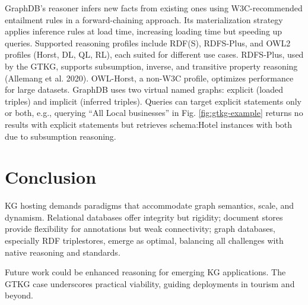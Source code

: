 \documentclass[12pt]{article}
\begin{document}
GraphDB’s reasoner infers new facts from existing ones using W3C-recommended entailment rules in a forward-chaining approach. Its materialization strategy applies inference rules at load time, increasing loading time but speeding up queries. Supported reasoning profiles include RDF(S), RDFS-Plus, and OWL2 profiles (Horst, DL, QL, RL), each suited for different use cases. RDFS-Plus, used by the GTKG, supports subsumption, inverse, and transitive property reasoning (Allemang et al. 2020). OWL-Horst, a non-W3C profile, optimizes performance for large datasets. GraphDB uses two virtual named graphs: explicit (loaded triples) and implicit (inferred triples). Queries can target explicit statements only or both, e.g., querying “All Local businesses” in Fig. \ref{fig:gtkg-example} returns no results with explicit statements but retrieves schema:Hotel instances with both due to subsumption reasoning.
\section{Conclusion}
KG hosting demands paradigms that accommodate graph semantics, scale, and dynamism. Relational databases offer integrity but rigidity; document stores provide flexibility for annotations but weak connectivity; graph databases, especially RDF triplestores, emerge as optimal, balancing all challenges with native reasoning and standards.

Future work could be enhanced reasoning for emerging KG applications. The GTKG case underscores practical viability, guiding deployments in tourism and beyond.
\end{document}
